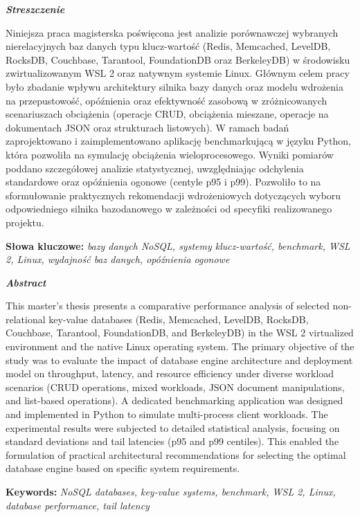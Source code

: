 \pagestyle{plain}

\begin{center}
    \textbf{\textit{Streszczenie}}
\end{center}

Niniejsza praca magisterska poświęcona jest analizie porównawczej wybranych nierelacyjnych baz danych typu klucz-wartość (Redis, Memcached, LevelDB, RocksDB, Couchbase, Tarantool, FoundationDB oraz BerkeleyDB) w środowisku zwirtualizowanym WSL 2 oraz natywnym systemie Linux. Głównym celem pracy było zbadanie wpływu architektury silnika bazy danych oraz modelu wdrożenia na przepustowość, opóźnienia oraz efektywność zasobową w zróżnicowanych scenariuszach obciążenia (operacje CRUD, obciążenia mieszane, operacje na dokumentach JSON oraz strukturach listowych). W ramach badań zaprojektowano i zaimplementowano aplikację benchmarkującą w języku Python, która pozwoliła na symulację obciążenia wieloprocesowego. Wyniki pomiarów poddano szczegółowej analizie statystycznej, uwzględniając odchylenia standardowe oraz opóźnienia ogonowe (centyle p95 i p99). Pozwoliło to na sformułowanie praktycznych rekomendacji wdrożeniowych dotyczących wyboru odpowiedniego silnika bazodanowego w zależności od specyfiki realizowanego projektu.

\par\vspace{0.5cm}
\noindent
\textbf{Słowa kluczowe:} \textit{bazy danych NoSQL, systemy klucz-wartość, benchmark, WSL 2, Linux, wydajność baz danych, opóźnienia ogonowe}

\vspace{1.5cm}

\begin{center}
    \textbf{\textit{Abstract}}
\end{center}

This master's thesis presents a comparative performance analysis of selected non-relational key-value databases (Redis, Memcached, LevelDB, RocksDB, Couchbase, Tarantool, FoundationDB, and BerkeleyDB) in the WSL 2 virtualized environment and the native Linux operating system. The primary objective of the study was to evaluate the impact of database engine architecture and deployment model on throughput, latency, and resource efficiency under diverse workload scenarios (CRUD operations, mixed workloads, JSON document manipulations, and list-based operations). A dedicated benchmarking application was designed and implemented in Python to simulate multi-process client workloads. The experimental results were subjected to detailed statistical analysis, focusing on standard deviations and tail latencies (p95 and p99 centiles). This enabled the formulation of practical architectural recommendations for selecting the optimal database engine based on specific system requirements.

\par\vspace{0.5cm}
\noindent
\textbf{Keywords:} \textit{NoSQL databases, key-value systems, benchmark, WSL 2, Linux, database performance, tail latency}
